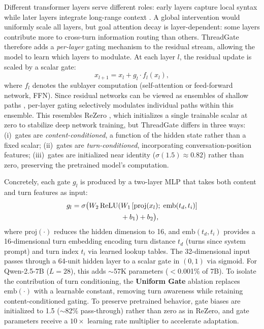 Different transformer layers serve different roles: early layers capture local syntax while later layers integrate long-range context \citep{gromov2024unreasonable}. A global intervention would uniformly scale all layers, but goal attention decay is layer-dependent: some layers contribute more to cross-turn information routing than others. ThreadGate therefore adds a \emph{per-layer} gating mechanism to the residual stream, allowing the model to learn which layers to modulate. At each layer $l$, the residual update is scaled by a scalar gate:
\begin{equation}
  x_{l+1} = x_l + g_l \cdot f_l(x_l),
\end{equation}
where $f_l$ denotes the sublayer computation (self-attention or feed-forward network, FFN). Since residual networks can be viewed as ensembles of shallow paths \citep{veit2016residual}, per-layer gating selectively modulates individual paths within this ensemble. This resembles ReZero \citep{bachlechner2021rezero}, which initializes a single trainable scalar at zero to stabilize deep network training, but ThreadGate differs in three ways: (i)~gates are \emph{content-conditioned}, a function of the hidden state rather than a fixed scalar; (ii)~gates are \emph{turn-conditioned}, incorporating conversation-position features; (iii)~gates are initialized near identity ($\sigma(1.5) \approx 0.82$) rather than zero, preserving the pretrained model's computation.

Concretely, each gate $g_l$ is produced by a two-layer MLP that takes both content and turn features as input:
\begin{align}\label{eq:gate}
  g_l = \sigma\bigl(W_2\,\text{ReLU}(&W_1\,[\text{proj}(x_l);\;\text{emb}(t_d, t_i)] \notag\\
  &+ b_1) + b_2\bigr),
\end{align}
where $\text{proj}(\cdot)$ reduces the hidden dimension to 16, and $\text{emb}(t_d, t_i)$ provides a 16-dimensional turn embedding encoding turn distance $t_d$ (turns since system prompt) and turn index $t_i$ via learned lookup tables. The 32-dimensional input passes through a 64-unit hidden layer to a scalar gate in $(0, 1)$ via sigmoid. For Qwen-2.5-7B ($L\!=\!28$), this adds ${\sim}$57K parameters ($<$0.001\% of 7B). To isolate the contribution of turn conditioning, the \textbf{Uniform Gate} ablation replaces $\text{emb}(\cdot)$ with a learnable constant, removing turn awareness while retaining content-conditioned gating. To preserve pretrained behavior, gate biases are initialized to 1.5 (${\sim}$82\% pass-through) rather than zero as in ReZero, and gate parameters receive a $10\times$ learning rate multiplier to accelerate adaptation.

